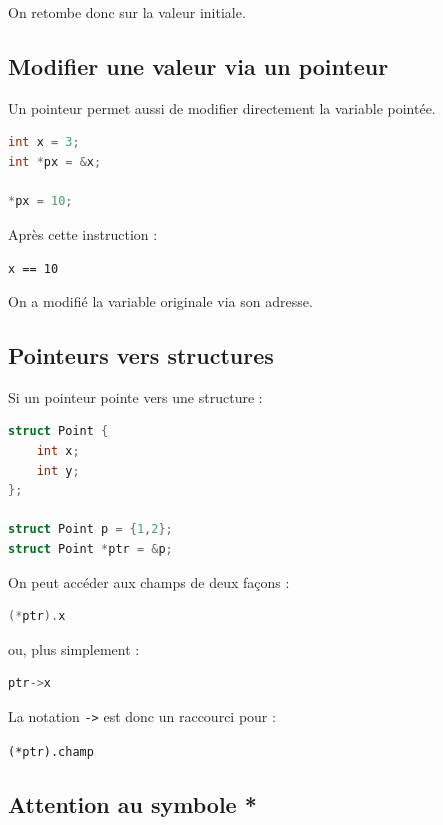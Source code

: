 On retombe donc sur la valeur initiale.

\subsection{Modifier une valeur via un pointeur}

Un pointeur permet aussi de modifier directement la variable pointée.

\begin{lstlisting}[language=C]
int x = 3;
int *px = &x;

*px = 10;
\end{lstlisting}

Après cette instruction :

\begin{center}
\texttt{x == 10}
\end{center}

On a modifié la variable originale via son adresse.

\subsection{Pointeurs vers structures}

Si un pointeur pointe vers une structure :

\begin{lstlisting}[language=C]
struct Point {
    int x;
    int y;
};

struct Point p = {1,2};
struct Point *ptr = &p;
\end{lstlisting}

On peut accéder aux champs de deux façons :

\begin{lstlisting}[language=C]
(*ptr).x
\end{lstlisting}

ou, plus simplement :

\begin{lstlisting}[language=C]
ptr->x
\end{lstlisting}

La notation \texttt{->} est donc un raccourci pour :

\begin{center}
\texttt{(*ptr).champ}
\end{center}

\subsection{Attention au symbole *}

